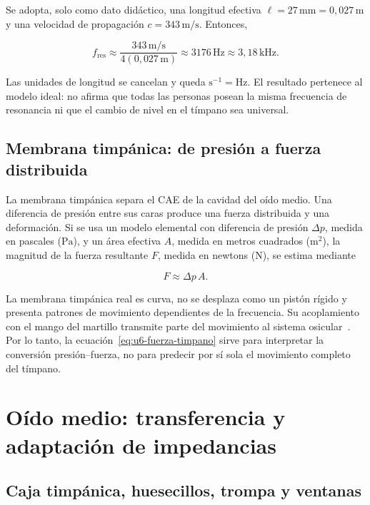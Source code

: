 Se adopta, solo como dato didáctico, una longitud efectiva
\(\ell=27\,\text{mm}=0{,}027\,\text{m}\) y una velocidad de propagación
\(c=343\,\text{m}/\text{s}\). Entonces,

\[
    f_\mathrm{res}
      \approx\frac{343\,\text{m}/\text{s}}
                    {4(0{,}027\,\text{m})}
      \approx3176\,\text{Hz}
      \approx3{,}18\,\text{kHz}.
\]

Las unidades de longitud se cancelan y queda \(\text{s}^{-1}=\text{Hz}\).
El resultado pertenece al modelo ideal: no afirma que todas las personas
posean la misma frecuencia de resonancia ni que el cambio de nivel en el
tímpano sea universal.

\subsection{Membrana timpánica: de presión a fuerza distribuida}
\label{sec:u6-timpano}

La membrana timpánica separa el CAE de la cavidad del oído medio. Una
diferencia de presión entre sus caras produce una fuerza distribuida y una
deformación. Si se usa un modelo elemental con diferencia de presión
\(\Delta p\), medida en pascales (\(\text{Pa}\)), y un área efectiva \(A\),
medida en metros cuadrados (\(\text{m}^2\)), la magnitud de la fuerza
resultante \(F\), medida en newtons (\(\text{N}\)), se estima mediante

\begin{equation}
    F\approx\Delta p\,A.
    \label{eq:u6-fuerza-timpano}
\end{equation}

La membrana timpánica real es curva, no se desplaza como un pistón
rígido y presenta patrones de movimiento dependientes de la frecuencia. Su
acoplamiento con el mango del martillo transmite parte del movimiento al
sistema osicular~\cite{ugarteburu2022}. Por lo tanto, la ecuación~\eqref{eq:u6-fuerza-timpano}
sirve para interpretar la conversión presión--fuerza, no para predecir por sí
sola el movimiento completo del tímpano.

\section{Oído medio: transferencia y adaptación de impedancias}
\label{sec:u6-oido-medio}

\subsection{Caja timpánica, huesecillos, trompa y ventanas}
\label{sec:u6-anatomia-oido-medio}

